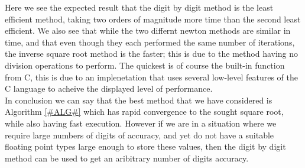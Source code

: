 Here we see the expected result that the digit by digit method is the least efficient method, taking two orders of magnitude more time than the second least efficient. We also see that while the two differnt newton methods are similar in time, and that even though they each performed the same number of iterations, the inverse square root method is the faster; this is due to the method having no division operations to perform. The quickest is of course the built-in  function from C, this is due to an implenetation that uses several low-level features of the C language to acheive the displayed level of performance.\\

In conclusion we can say that the best method that we have considered is Algorithm \ref{#ALG#} which has rapid convergence to the sought square root, while also having fast execution. However if we are in a situation where we require large numbers of digits of accuracy, and yet do not have a suitable floating point types large enough to store these values, then the digit by digit method can be used to get an aribitrary number of digits accuracy.
